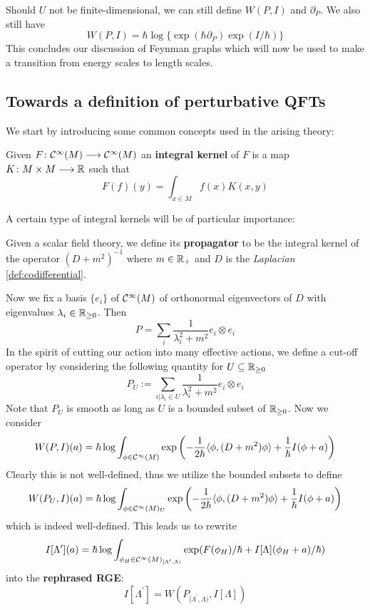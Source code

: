 Should $U$ not be finite-dimensional, we can still define $W(P,I)$ and $\partial_P$. We also still have
$$ W(P,I) = \hbar \log\{ \exp(\hbar \partial_P) \exp(I/\hbar) \} $$
This concludes our discussion of Feynman graphs which will now be used to make a transition from energy scales to length scales.

\subsection{Towards a definition of perturbative QFTs}

We start by introducing some common concepts used in the arising theory:

\begin{definition}
  Given $F\colon \mathcal{C}^{\infty}(M) \longrightarrow \mathcal{C}^{\infty}(M)$ an \textbf{integral kernel} of $F$ is a map $K \colon M \times M \longrightarrow \mathbb{R}$ such that
  $$ F(f)(y) = \int_{x \in M} f(x) K(x,y) $$
\end{definition}

A certain type of integral kernels will be of particular importance:

\begin{definition}[Propagators]
  Given a scalar field theory, we define its \textbf{propagator} to be the integral kernel of the operator $(D+m^2)^{-1}$ where $m \in \mathbb{R}_+$ and $D$ is the \emph{Laplacian} \ref{def:codifferential}.
\end{definition}

Now we fix a basis $\{e_i\}$ of $\mathcal{C}^{\infty}(M)$ of orthonormal eigenvectors of $D$ with eigenvalues $\lambda_i \in \mathbb{R}_{\geq 0}$. Then
$$ P = \sum_i \frac{1}{\lambda_i^2 + m^2} e_i \otimes e_i $$
In the spirit of cutting our action into many effective actions, we define a cut-off operator by considering the following quantity for $U \subseteq \mathbb{R}_{\geq 0}$
$$ P_U := \sum_{i|\lambda_i \in U} \frac{1}{\lambda_i^2 + m^2} e_i \otimes e_i $$
Note that $P_U$ is smooth as long as $U$ is a bounded subset of $\mathbb{R}_{\geq 0}$. Now we consider
$$ W(P,I)(a) = \hbar \log \int_{\phi \in \Ci(M)} \exp\left( - \frac{1}{2\hbar} \langle \phi, (D+m^2) \phi \rangle + \frac{1}{\hbar} I(\phi +a) \right) $$
Clearly this is not well-defined, thus we utilize the bounded subsets to define
$$ W(P_U,I)(a) = \hbar \log \int_{\phi \in \Ci(M)_U} \exp\left( - \frac{1}{2\hbar} \langle \phi, (D+m^2) \phi \rangle + \frac{1}{\hbar} I(\phi +a) \right) $$
which is indeed well-defined. This leads us to rewrite
$$ I[\Lambda^\prime](a) = \hbar \log \int_{\phi_H \in \Ci(M)_{[\Lambda^\prime, \Lambda)}} \exp(F(\phi_H) / \hbar + I[\Lambda](\phi_H + a)/\hbar) $$
into the \textbf{rephrased RGE}:
\begin{equation}
\label{eq:RGE_2}\tag{RGE}
I[\Lambda^\prime] = W \left( P_{[\Lambda^\prime, \Lambda)}, I[\Lambda] \right)
\end{equation}

